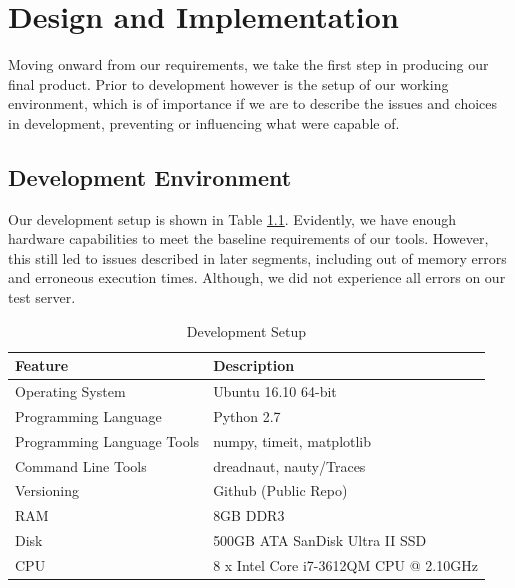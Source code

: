 \chapter{Design and Implementation}

\ifpdf
    \graphicspath{{Chapter3/Figs/Raster/}{Chapter3/Figs/PDF/}{Chapter3/Figs/}}
\else
    \graphicspath{{Chapter3/Figs/Vector/}{Chapter3/Figs/}}
\fi

Moving onward from our requirements, we take the first step in producing our final product. Prior to development however is the setup of our working environment, which is of importance if we are to describe the issues and choices in development, preventing or influencing what were capable of. 

\section[Development Environment]{Development Environment}
Our development setup is shown in Table \ref{tab:t1}. Evidently, we have enough hardware capabilities to meet the baseline requirements of our tools. However, this still led to issues described in later segments, including out of memory errors and erroneous execution times. Although, we did not experience all errors on our test server. 

\begin{table}
	\caption{Development Setup}
	\centering
	\label{table:good_table}
	\begin{tabular}{l l}
		\toprule
		Feature & Description  \\ 
		\midrule
		Operating System & Ubuntu 16.10 64-bit \\
		Programming Language &  Python 2.7\\
		Programming Language Tools & numpy, timeit, matplotlib\\
		Command Line Tools & dreadnaut, nauty/Traces \\
		Versioning & Github (Public Repo) \\
		RAM & 8GB DDR3 \\
		Disk & 500GB ATA SanDisk Ultra II SSD \\
		CPU & 8 x Intel Core i7-3612QM CPU @ 2.10GHz \\
		\bottomrule
	\end{tabular}
	\label{tab:t1}
\end{table}




